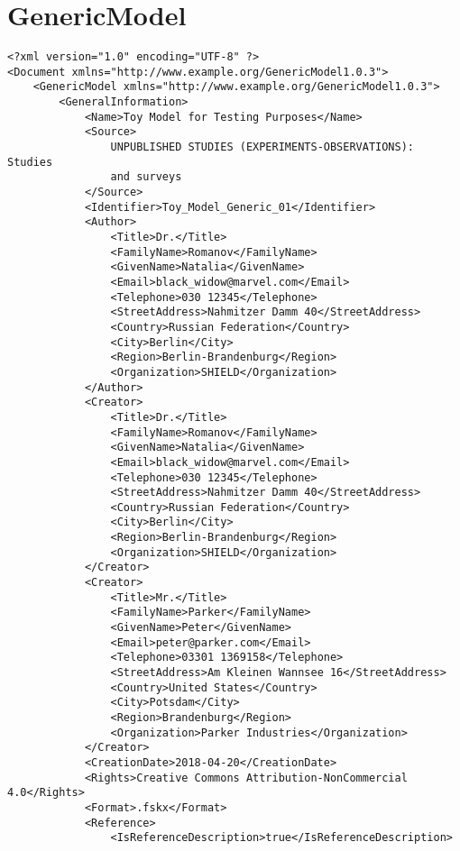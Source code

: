 \section{GenericModel}

\begin{lstlisting}[language=RAKIP, caption={Example of GenericModel}]
<?xml version="1.0" encoding="UTF-8" ?>
<Document xmlns="http://www.example.org/GenericModel1.0.3">
    <GenericModel xmlns="http://www.example.org/GenericModel1.0.3">
        <GeneralInformation>
            <Name>Toy Model for Testing Purposes</Name>
            <Source>
                UNPUBLISHED STUDIES (EXPERIMENTS-OBSERVATIONS): Studies
                and surveys
            </Source>
            <Identifier>Toy_Model_Generic_01</Identifier>
            <Author>
                <Title>Dr.</Title>
                <FamilyName>Romanov</FamilyName>
                <GivenName>Natalia</GivenName>
                <Email>black_widow@marvel.com</Email>
                <Telephone>030 12345</Telephone>
                <StreetAddress>Nahmitzer Damm 40</StreetAddress>
                <Country>Russian Federation</Country>
                <City>Berlin</City>
                <Region>Berlin-Brandenburg</Region>
                <Organization>SHIELD</Organization>
            </Author>
            <Creator>
                <Title>Dr.</Title>
                <FamilyName>Romanov</FamilyName>
                <GivenName>Natalia</GivenName>
                <Email>black_widow@marvel.com</Email>
                <Telephone>030 12345</Telephone>
                <StreetAddress>Nahmitzer Damm 40</StreetAddress>
                <Country>Russian Federation</Country>
                <City>Berlin</City>
                <Region>Berlin-Brandenburg</Region>
                <Organization>SHIELD</Organization>
            </Creator>
            <Creator>
                <Title>Mr.</Title>
                <FamilyName>Parker</FamilyName>
                <GivenName>Peter</GivenName>
                <Email>peter@parker.com</Email>
                <Telephone>03301 1369158</Telephone>
                <StreetAddress>Am Kleinen Wannsee 16</StreetAddress>
                <Country>United States</Country>
                <City>Potsdam</City>
                <Region>Brandenburg</Region>
                <Organization>Parker Industries</Organization>
            </Creator>
            <CreationDate>2018-04-20</CreationDate>
            <Rights>Creative Commons Attribution-NonCommercial 4.0</Rights>
            <Format>.fskx</Format>
            <Reference>
                <IsReferenceDescription>true</IsReferenceDescription>

\end{lstlisting}
